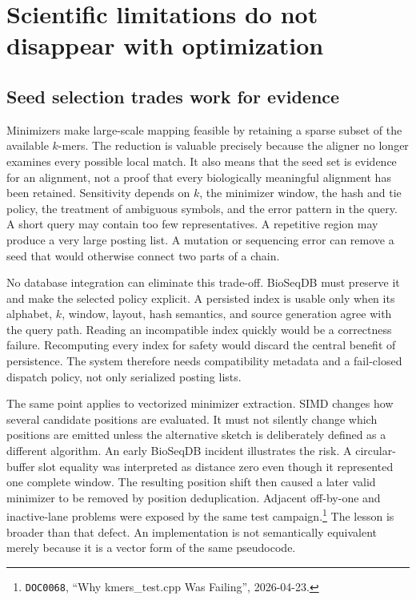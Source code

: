 \section{Scientific limitations do not disappear with optimization}
\label{sec:scientific-solution-gaps}

\subsection{Seed selection trades work for evidence}

Minimizers make large-scale mapping feasible by retaining a sparse subset
of the available \(k\)-mers.  The reduction is valuable precisely because
the aligner no longer examines every possible local match.  It also means
that the seed set is evidence for an alignment, not a proof that every
biologically meaningful alignment has been retained.  Sensitivity depends
on \(k\), the minimizer window, the hash and tie policy, the treatment of
ambiguous symbols, and the error pattern in the query.  A short query may
contain too few representatives.  A repetitive region may produce a very
large posting list.  A mutation or sequencing error can remove a seed
that would otherwise connect two parts of a chain.

No database integration can eliminate this trade-off.  BioSeqDB must
preserve it and make the selected policy explicit.  A persisted index is
usable only when its alphabet, \(k\), window, layout, hash semantics, and
source generation agree with the query path.  Reading an incompatible
index quickly would be a correctness failure.  Recomputing every index
for safety would discard the central benefit of persistence.  The system
therefore needs compatibility metadata and a fail-closed dispatch policy,
not only serialized posting lists.

The same point applies to vectorized minimizer extraction.  SIMD changes
how several candidate positions are evaluated.  It must not silently
change which positions are emitted unless the alternative sketch is
deliberately defined as a different algorithm.  An early BioSeqDB
incident illustrates the risk.  A circular-buffer slot equality was
interpreted as distance zero even though it represented one complete
window.  The resulting position shift then caused a later valid
minimizer to be removed by position deduplication.  Adjacent off-by-one
and inactive-lane problems were exposed by the same test
campaign.\footnote{\texttt{DOC0068}, ``Why kmers\_test.cpp Was
Failing'', 2026-04-23.}  The lesson is broader than that defect.  An
implementation is not semantically equivalent merely because it is a
vector form of the same pseudocode.

